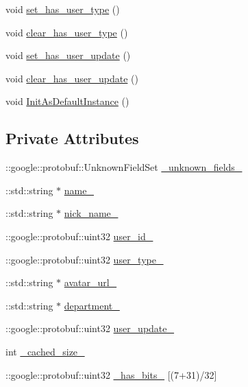 \begin{DoxyCompactItemize}
void \hyperlink{class_i_m_1_1_base_define_1_1_server_user_info_aa33d7ead4367dceaa6551898e81ba001}{set\+\_\+has\+\_\+user\+\_\+type} ()
\item 
void \hyperlink{class_i_m_1_1_base_define_1_1_server_user_info_a30374f88743f0ec780fd10f3c6ae9c34}{clear\+\_\+has\+\_\+user\+\_\+type} ()
\item 
void \hyperlink{class_i_m_1_1_base_define_1_1_server_user_info_ab0cc9c7d6088e3f732003e47df6e2bc8}{set\+\_\+has\+\_\+user\+\_\+update} ()
\item 
void \hyperlink{class_i_m_1_1_base_define_1_1_server_user_info_aae39daf0b1076d1c2b4fa6326d552236}{clear\+\_\+has\+\_\+user\+\_\+update} ()
\item 
void \hyperlink{class_i_m_1_1_base_define_1_1_server_user_info_a05df9ef104fff09d752499a453dff841}{Init\+As\+Default\+Instance} ()
\end{DoxyCompactItemize}
\subsection*{Private Attributes}
\begin{DoxyCompactItemize}
\item 
\+::google\+::protobuf\+::\+Unknown\+Field\+Set \hyperlink{class_i_m_1_1_base_define_1_1_server_user_info_a250e0c7adb6a91508ab765d627973278}{\+\_\+unknown\+\_\+fields\+\_\+}
\item 
\+::std\+::string $\ast$ \hyperlink{class_i_m_1_1_base_define_1_1_server_user_info_a81d56c36487e95a567aa2e19f9e0e7a5}{name\+\_\+}
\item 
\+::std\+::string $\ast$ \hyperlink{class_i_m_1_1_base_define_1_1_server_user_info_af2a4add340eac328ef949b9737e850ac}{nick\+\_\+name\+\_\+}
\item 
\+::google\+::protobuf\+::uint32 \hyperlink{class_i_m_1_1_base_define_1_1_server_user_info_af3fc47d772c55443eb984f80786d580b}{user\+\_\+id\+\_\+}
\item 
\+::google\+::protobuf\+::uint32 \hyperlink{class_i_m_1_1_base_define_1_1_server_user_info_acb21d94375d990f2a0b28b67ce72a8ea}{user\+\_\+type\+\_\+}
\item 
\+::std\+::string $\ast$ \hyperlink{class_i_m_1_1_base_define_1_1_server_user_info_ae6fa555866d1641ffee5e04762699809}{avatar\+\_\+url\+\_\+}
\item 
\+::std\+::string $\ast$ \hyperlink{class_i_m_1_1_base_define_1_1_server_user_info_a50decea4e9592312b5d48f4a46e7d0d7}{department\+\_\+}
\item 
\+::google\+::protobuf\+::uint32 \hyperlink{class_i_m_1_1_base_define_1_1_server_user_info_aa8096b53af51716884bec0a17945280d}{user\+\_\+update\+\_\+}
\item 
int \hyperlink{class_i_m_1_1_base_define_1_1_server_user_info_a7fb4eab7dfda0fc79cc173ddcdd59670}{\+\_\+cached\+\_\+size\+\_\+}
\item 
\+::google\+::protobuf\+::uint32 \hyperlink{class_i_m_1_1_base_define_1_1_server_user_info_aa6b22f7f89571c954e3841de436cd9df}{\+\_\+has\+\_\+bits\+\_\+} \mbox{[}(7+31)/32\mbox{]}
\end{DoxyCompactItemize}
